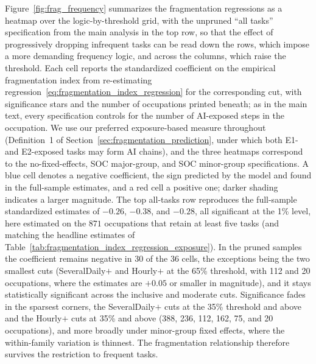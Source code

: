 Figure~\ref{fig:frag_frequency} summarizes the fragmentation regressions as a heatmap over the logic-by-threshold grid, with the unpruned ``all tasks'' specification from the main analysis in the top row, so that the effect of progressively dropping infrequent tasks can be read down the rows, which impose a more demanding frequency logic, and across the columns, which raise the threshold.
Each cell reports the standardized coefficient on the empirical fragmentation index from re-estimating regression~\eqref{eq:fragmentation_index_regression} for the corresponding cut, with significance stars and the number of occupations printed beneath; as in the main text, every specification controls for the number of AI-exposed steps in the occupation.
We use our preferred exposure-based measure throughout (Definition~1 of Section~\ref{sec:fragmentation_prediction}, under which both E1- and E2-exposed tasks may form AI chains), and the three heatmaps correspond to the no-fixed-effects, SOC major-group, and SOC minor-group specifications.
A blue cell denotes a negative coefficient, the sign predicted by the model and found in the full-sample estimates, and a red cell a positive one; darker shading indicates a larger magnitude.
The top all-tasks row reproduces the full-sample standardized estimates of $-0.26$, $-0.38$, and $-0.28$, all significant at the 1\% level, here estimated on the $871$ occupations that retain at least five tasks (and matching the headline estimates of Table~\ref{tab:fragmentation_index_regression_exposure}).
In the pruned samples the coefficient remains negative in 30 of the 36 cells, the exceptions being the two smallest cuts (SeveralDaily$+$ and Hourly$+$ at the 65\% threshold, with 112 and 20 occupations, where the estimates are $+0.05$ or smaller in magnitude), and it stays statistically significant across the inclusive and moderate cuts.
Significance fades in the sparsest corners, the SeveralDaily$+$ cuts at the 35\% threshold and above and the Hourly$+$ cuts at 35\% and above (388, 236, 112, 162, 75, and 20 occupations), and more broadly under minor-group fixed effects, where the within-family variation is thinnest.
The fragmentation relationship therefore survives the restriction to frequent tasks.

